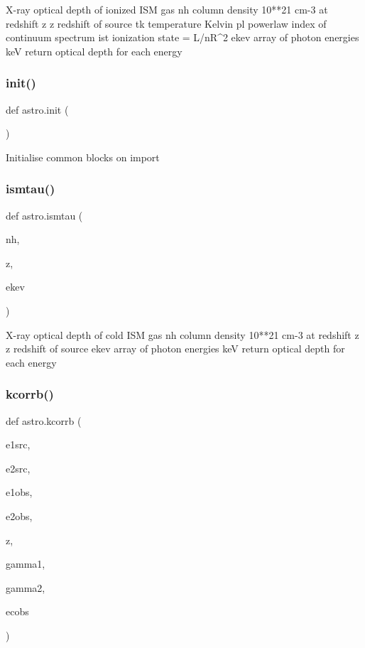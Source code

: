 \begin{DoxyVerb}X-ray optical depth of ionized ISM gas
    nh      column density 10**21 cm-3 at redshift z
    z       redshift of source
    tk      temperature Kelvin
    pl      powerlaw index of continuum spectrum
    ist     ionization state = L/nR^2
    ekev    array of photon energies keV
return  optical depth for each energy
\end{DoxyVerb}
 \mbox{\label{namespaceastro_afd2c493707f37b92d28be18ec3375a98}} 
\subsubsection{\texorpdfstring{init()}{init()}}
{\footnotesize\ttfamily def astro.\+init (\begin{DoxyParamCaption}{ }\end{DoxyParamCaption})}

\begin{DoxyVerb}Initialise common blocks on import\end{DoxyVerb}
 \mbox{\label{namespaceastro_a490b2c8ec99e8c27321a6033a1c6112e}} 
\subsubsection{\texorpdfstring{ismtau()}{ismtau()}}
{\footnotesize\ttfamily def astro.\+ismtau (\begin{DoxyParamCaption}\item[{}]{nh,  }\item[{}]{z,  }\item[{}]{ekev }\end{DoxyParamCaption})}

\begin{DoxyVerb}X-ray optical depth of cold ISM gas
    nh      column density 10**21 cm-3 at redshift z
    z       redshift of source
    ekev    array of photon energies keV
return  optical depth for each energy
\end{DoxyVerb}
 \mbox{\label{namespaceastro_a242d13266dd9fc08ce3ca8b731fba278}} 
\subsubsection{\texorpdfstring{kcorrb()}{kcorrb()}}
{\footnotesize\ttfamily def astro.\+kcorrb (\begin{DoxyParamCaption}\item[{}]{e1src,  }\item[{}]{e2src,  }\item[{}]{e1obs,  }\item[{}]{e2obs,  }\item[{}]{z,  }\item[{}]{gamma1,  }\item[{}]{gamma2,  }\item[{}]{ecobs }\end{DoxyParamCaption})}

